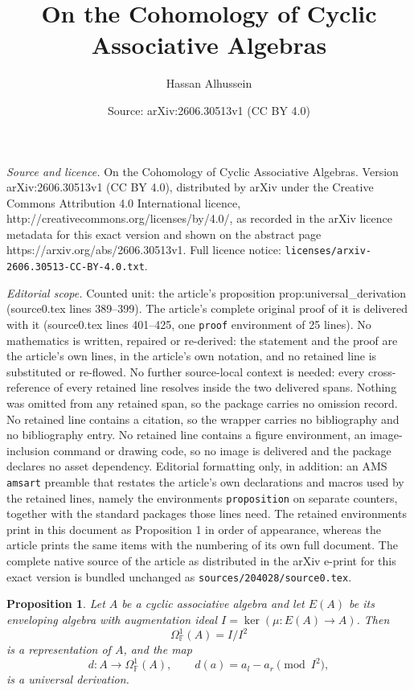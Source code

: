 \documentclass[10pt,a4paper]{amsart}
\title{On the Cohomology of Cyclic Associative Algebras}
\author{Hassan Alhussein}
\date{Source: arXiv:2606.30513v1 (CC BY 4.0)}
\newtheorem{proposition}{Proposition}
\begin{document}
\maketitle

\noindent\emph{Source and licence.} On the Cohomology of Cyclic Associative Algebras. Version arXiv:2606.30513v1 (CC BY 4.0), distributed by arXiv under the Creative Commons Attribution 4.0 International licence, http://creativecommons.org/licenses/by/4.0/, as recorded in the arXiv licence metadata for this exact version and shown on the abstract page https://arxiv.org/abs/2606.30513v1. Full licence notice: \texttt{licenses/arxiv-2606.30513-CC-BY-4.0.txt}.\par\smallskip

\noindent\textit{Editorial scope.} Counted unit: the article's proposition prop:universal\_derivation (source0.tex lines 389--399). The article's complete original proof of it is delivered with it (source0.tex lines 401--425, one \texttt{proof} environment of 25 lines). No mathematics is written, repaired or re-derived: the statement and the proof are the article's own lines, in the article's own notation, and no retained line is substituted or re-flowed.  No further source-local context is needed: every cross-reference of every retained line resolves inside the two delivered spans.  Nothing was omitted from any retained span, so the package carries no omission record.  No retained line contains a citation, so the wrapper carries no bibliography and no bibliography entry.  No retained line contains a figure environment, an image-inclusion command or drawing code, so no image is delivered and the package declares no asset dependency.  Editorial formatting only, in addition: an AMS \texttt{amsart} preamble that restates the article's own declarations and macros used by the retained lines, namely the environments \texttt{proposition} on separate counters, together with the standard packages those lines need.  The retained environments print in this document as Proposition 1 in order of appearance, whereas the article prints the same items with the numbering of its own full document.  The complete native source of the article as distributed in the arXiv e-print for this exact version is bundled unchanged as \texttt{sources/204028/source0.tex}.
\begin{proposition}\label{prop:universal_derivation}
Let $A$ be a cyclic associative algebra and let $E(A)$ be its enveloping algebra with augmentation ideal $I = \ker(\mu: E(A) \to A)$. Then
\[
\Omega^1_{\mathbb{F}}(A) = I / I^2
\]
is a representation of $A$, and the map
\[
d: A \to \Omega^1_{\mathbb{F}}(A), \qquad d(a) = a_l - a_r \pmod{I^2},
\]
is a universal derivation.
\end{proposition}
\end{document}
